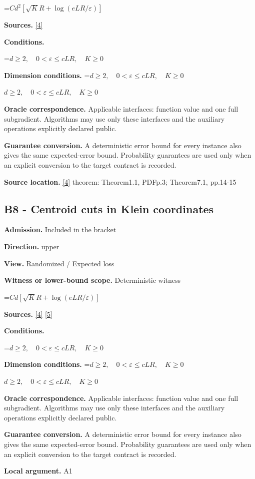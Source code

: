 \documentclass[10pt,a4paper]{article}
\newcommand{\AtlasMath}[1]{\par\begingroup\centering\setbox0=\hbox{$\displaystyle #1$}\ifdim\wd0>1.4\linewidth\typeout{ATLAS WIDE FORMULA: \the\wd0}\fi\ifdim\wd0>\linewidth\resizebox{\linewidth}{!}{\box0}\else\box0\fi\par\endgroup}
\newcommand{\AtlasInlineMath}[1]{\begingroup\setbox0=\hbox{$#1$}\ifdim\wd0>.4\linewidth\endgroup\AtlasMath{#1}\else\endgroup$#1$\fi}
\begin{document}
\AtlasMath{C d^2[\sqrt K R+\log(eLR/\varepsilon)]}
\textbf{Sources.} \href{https://arxiv.org/pdf/2605.17540v4}{[4]}

\textbf{Conditions.} 
\AtlasMath{d\ge2,\quad0<\varepsilon\le cLR,\quad K\ge0}


\textbf{Dimension conditions.} \AtlasInlineMath{d\ge2,\quad0<\varepsilon\le cLR,\quad K\ge0}

\textbf{Oracle correspondence.} Applicable interfaces: function value and one full subgradient. Algorithms may use only these interfaces and the auxiliary operations explicitly declared public.

\textbf{Guarantee conversion.} A deterministic error bound for every instance also gives the same expected-error bound. Probability guarantees are used only when an explicit conversion to the target contract is recorded.

\textbf{Source location.} \href{https://arxiv.org/pdf/2605.17540v4}{[4]} theorem: Theorem1.1, PDFp.3; Theorem7.1, pp.14-15

\subsection{B8 - Centroid cuts in Klein coordinates}
\textbf{Admission.} Included in the bracket

\textbf{Direction.} upper

\textbf{View.} Randomized / Expected loss

\textbf{Witness or lower-bound scope.} Deterministic witness

\AtlasMath{C d[\sqrt K R+\log(eLR/\varepsilon)]}
\textbf{Sources.} \href{https://arxiv.org/pdf/2605.17540v4}{[4]} \href{https://arxiv.org/pdf/1405.4980}{[5]}

\textbf{Conditions.} 
\AtlasMath{d\ge2,\quad0<\varepsilon\le cLR,\quad K\ge0}


\textbf{Dimension conditions.} \AtlasInlineMath{d\ge2,\quad0<\varepsilon\le cLR,\quad K\ge0}

\textbf{Oracle correspondence.} Applicable interfaces: function value and one full subgradient. Algorithms may use only these interfaces and the auxiliary operations explicitly declared public.

\textbf{Guarantee conversion.} A deterministic error bound for every instance also gives the same expected-error bound. Probability guarantees are used only when an explicit conversion to the target contract is recorded.

\textbf{Local argument.} A1
\end{document}
